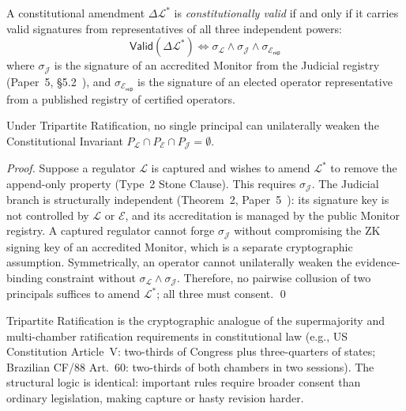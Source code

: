 \begin{definition}
\label{def:tripartite}
A constitutional amendment $\Delta\mathcal{L}^*$ is
\emph{constitutionally valid} if and only if it carries valid
signatures from representatives of all three independent powers:
\[
  \mathsf{Valid}(\Delta\mathcal{L}^*) \iff
  \sigma_{\mathcal{L}} \wedge \sigma_{\mathcal{J}} \wedge
  \sigma_{\mathcal{E}_{\mathsf{rep}}}
\]
where $\sigma_{\mathcal{J}}$ is the signature of an accredited Monitor
from the Judicial registry (Paper~5, \S5.2~\cite{btv-cc}), and
$\sigma_{\mathcal{E}_{\mathsf{rep}}}$ is the signature of an elected
operator representative from a published registry of certified
operators.
\end{definition}

\begin{theorem}
\label{thm:amendment-soundness}
Under Tripartite Ratification, no single principal can unilaterally
weaken the Constitutional Invariant $P_{\mathcal{L}} \cap
P_{\mathcal{E}} \cap P_{\mathcal{J}} = \emptyset$.
\end{theorem}

\begin{proof}
Suppose a regulator $\mathcal{L}$ is captured and wishes to amend
$\mathcal{L}^*$ to remove the append-only property (Type~2 Stone
Clause). This requires $\sigma_{\mathcal{J}}$. The Judicial branch
is structurally independent (Theorem~2, Paper~5~\cite{btv-cc}): its
signature key is not controlled by $\mathcal{L}$ or $\mathcal{E}$,
and its accreditation is managed by the public Monitor registry.
A captured regulator cannot forge $\sigma_{\mathcal{J}}$ without
compromising the ZK signing key of an accredited Monitor, which is
a separate cryptographic assumption. Symmetrically, an operator
cannot unilaterally weaken the evidence-binding constraint without
$\sigma_{\mathcal{L}} \wedge \sigma_{\mathcal{J}}$. Therefore, no
pairwise collusion of two principals suffices to amend
$\mathcal{L}^*$; all three must consent. \qed
\end{proof}

\begin{remark}
Tripartite Ratification is the cryptographic analogue of the
supermajority and multi-chamber ratification requirements in
constitutional law (e.g., US Constitution Article~V: two-thirds of
Congress plus three-quarters of states; Brazilian CF/88 Art.~60:
two-thirds of both chambers in two sessions). The structural logic
is identical: important rules require broader consent than ordinary
legislation, making capture or hasty revision harder.
\end{remark}

